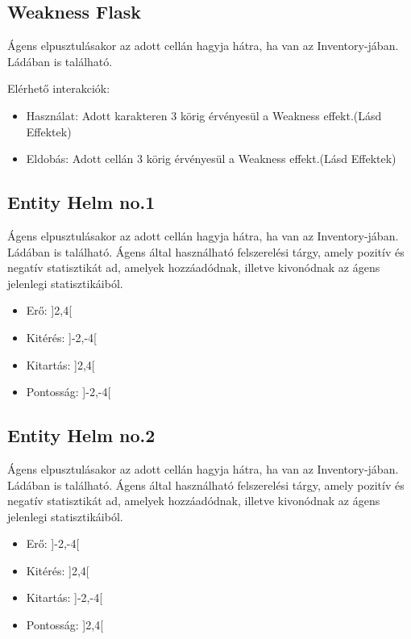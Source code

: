\subsection{Weakness Flask}

Ágens elpusztulásakor az adott cellán hagyja hátra, ha van az Inventory-jában. Ládában is található.

\noindent Elérhető interakciók:
\begin{itemize}
    \item Használat: Adott karakteren 3 körig érvényesül a Weakness effekt.(Lásd Effektek)
    \item Eldobás: Adott cellán 3 körig érvényesül a Weakness effekt.(Lásd Effektek)
\end{itemize}

\subsection{Entity Helm no.1}

Ágens elpusztulásakor az adott cellán hagyja hátra, ha van az Inventory-jában. Ládában is található.
Ágens által használható felszerelési tárgy, amely pozitív és negatív statisztikát ad, amelyek hozzáadódnak, illetve kivonódnak az ágens jelenlegi statisztikáiból.

\begin{itemize}
    \item Erő: ]2,4[
    \item Kitérés: ]-2,-4[
    \item Kitartás: ]2,4[
    \item Pontosság: ]-2,-4[
\end{itemize}

\subsection{Entity Helm no.2}

Ágens elpusztulásakor az adott cellán hagyja hátra, ha van az Inventory-jában. Ládában is található.
Ágens által használható felszerelési tárgy, amely pozitív és negatív statisztikát ad, amelyek hozzáadódnak, illetve kivonódnak az ágens jelenlegi statisztikáiból.

\begin{itemize}
    \item Erő: ]-2,-4[
    \item Kitérés: ]2,4[
    \item Kitartás: ]-2,-4[
    \item Pontosság: ]2,4[
\end{itemize}

